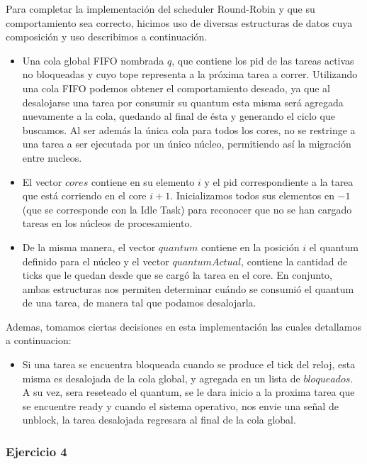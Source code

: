 \indent \indent Para completar la implementación del scheduler Round-Robin y que su comportamiento sea correcto, hicimos uso de diversas estructuras de datos cuya composición y uso describimos a continuación.\\
\begin{itemize}
\item Una cola global FIFO nombrada $q$, que contiene los pid de las tareas activas no bloqueadas y cuyo tope representa a la próxima tarea a correr. 
Utilizando una cola FIFO podemos obtener el comportamiento deseado, ya  que al desalojarse una tarea por consumir su quantum esta misma será agregada nuevamente a la cola, quedando al final de ésta y generando el ciclo que buscamos.
Al ser además la única cola para todos los cores, no se restringe a una tarea a ser ejecutada por un único núcleo, permitiendo así la migración entre nucleos.\\
\item El vector $cores$ contiene en su elemento $i$ y el pid correspondiente a la tarea que está corriendo en el core $i+1$. Inicializamos todos sus elementos en $-1$ (que se corresponde con la Idle Task) para reconocer que no se han cargado tareas en los núcleos de procesamiento.\\
\item De la misma manera, el vector $quantum$ contiene en la posición $i$ el quantum definido para el núcleo y el vector $quantumActual$, contiene la cantidad de ticks que le quedan desde que se cargó la tarea en el core. 
En conjunto, ambas estructuras nos permiten determinar cuándo se consumió el quantum de una tarea, de manera tal que podamos desalojarla.\\
\end{itemize}
\indent Ademas, tomamos ciertas decisiones en esta implementación las cuales detallamos a continuacion:
\begin{itemize}
 \item Si una tarea se encuentra bloqueada cuando se produce el tick del reloj, esta misma es desalojada de la cola global, 
 y agregada en un lista de $bloqueados$. A su vez, sera reseteado el quantum, se le dara inicio a la proxima tarea que se encuentre
 ready y cuando el sistema operativo, nos envie una señal de unblock, la tarea desalojada regresara al final de la cola global.
\end{itemize}


\subsubsection[Resolución Ejercicio 4]{Ejercicio 4}

